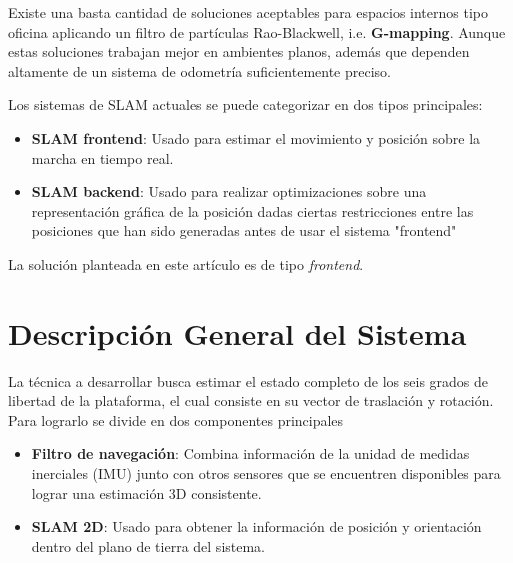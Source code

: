 \documentclass[10pt,a4paper]{article}
\begin{document}
Existe una basta cantidad de soluciones aceptables para espacios internos tipo oficina aplicando un filtro de partículas Rao-Blackwell, i.e. \textbf{G-mapping}. Aunque estas soluciones trabajan mejor en ambientes planos, además que dependen altamente de un sistema de odometría suficientemente preciso.

Los sistemas de SLAM actuales se puede categorizar en dos tipos principales:

\begin{itemize}

\item \textbf{SLAM frontend}: Usado para estimar el movimiento y posición sobre la marcha en tiempo real.
\item \textbf{SLAM backend}: Usado para realizar optimizaciones sobre una representación gráfica de la posición dadas ciertas restricciones entre las posiciones que han sido generadas antes de usar el sistema "frontend"

\end{itemize}

La solución planteada en este artículo es de tipo \emph{frontend}.






\section{Descripción General del Sistema}

La técnica a desarrollar busca estimar el estado completo de los seis grados de libertad de la plataforma, el cual consiste en su vector de traslación y rotación. Para lograrlo se divide en dos componentes principales

\begin{itemize}[noitemsep]

\item \textbf{Filtro de navegación}: Combina información de la unidad de medidas inerciales (IMU) junto con otros sensores que se encuentren disponibles para lograr una estimación 3D consistente.

\item \textbf{SLAM 2D}: Usado para obtener la información de posición y orientación dentro del plano de tierra del sistema.

\end{itemize}
\end{document}
